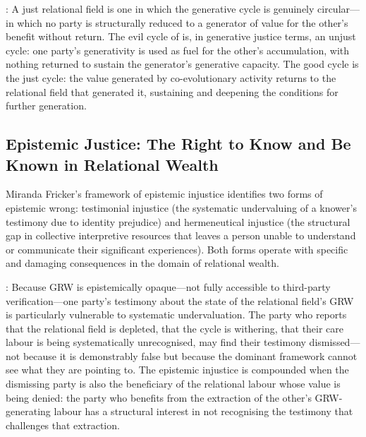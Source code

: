 : A just relational field is one in which the generative cycle is genuinely circular---in which no party is structurally reduced to a generator of value for the other's benefit without return. The evil cycle of  \parencite{paperix} is, in generative justice terms, an unjust cycle: one party's generativity is used as fuel for the other's accumulation, with nothing returned to sustain the generator's generative capacity. The good cycle is the just cycle: the value generated by co-evolutionary activity returns to the relational field that generated it, sustaining and deepening the conditions for further generation.

\subsection{Epistemic Justice: The Right to Know and Be Known in Relational Wealth}
\label{p15:subsec:epistemic_justice}

\noindent
Miranda Fricker's framework of epistemic injustice \parencite{fricker2007} identifies two forms of epistemic wrong: testimonial injustice (the systematic undervaluing of a knower's testimony due to identity prejudice) and hermeneutical injustice (the structural gap in collective interpretive resources that leaves a person unable to understand or communicate their significant experiences). Both forms operate with specific and damaging consequences in the domain of relational wealth.

: Because GRW is epistemically opaque---not fully accessible to third-party verification---one party's testimony about the state of the relational field's GRW is particularly vulnerable to systematic undervaluation. The party who reports that the relational field is depleted, that the cycle is withering, that their care labour is being systematically unrecognised, may find their testimony dismissed---not because it is demonstrably false but because the dominant framework cannot see what they are pointing to. The epistemic injustice is compounded when the dismissing party is also the beneficiary of the relational labour whose value is being denied: the party who benefits from the extraction of the other's GRW-generating labour has a structural interest in not recognising the testimony that challenges that extraction.

